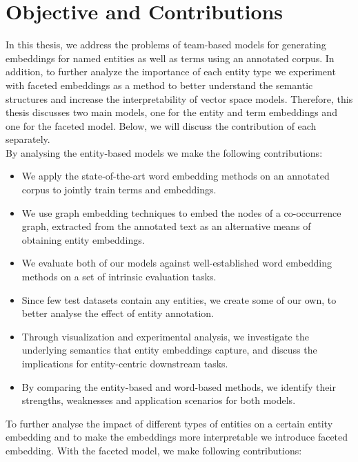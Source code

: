 \section{Objective and Contributions}
In this thesis, we address the problems of team-based models for generating embeddings for named entities as well as terms using an annotated corpus. In addition, to further analyze the importance of each entity type we experiment with faceted embeddings as a method to better understand the semantic structures and increase the interpretability of vector space models. Therefore, this thesis discusses two main models, one for the entity and term embeddings and one for the faceted model. Below, we will discuss the contribution of each separately.\\
By analysing the entity-based models we make the following contributions:
\begin{itemize}
\item We apply the state-of-the-art word embedding methods on an annotated corpus to jointly train terms and embeddings. 
\item We use graph embedding techniques to embed the nodes of a co-occurrence graph, extracted from the annotated text as an alternative means of obtaining entity embeddings. 
\item We evaluate both of our models against well-established word embedding methods on a set of intrinsic evaluation tasks. 
\item Since few test datasets contain any entities, we create some of our own, to better analyse the effect of entity annotation. 
\item Through visualization and experimental analysis, we investigate the underlying semantics that entity embeddings capture,  and discuss the implications for entity-centric downstream tasks.
\item By comparing the entity-based and word-based methods, we identify their strengths, weaknesses and application scenarios for both models.
\end{itemize}
To further analyse the impact of different types of entities on a certain entity embedding and to make the embeddings more interpretable we introduce faceted embedding. With the faceted model, we make following contributions: 
